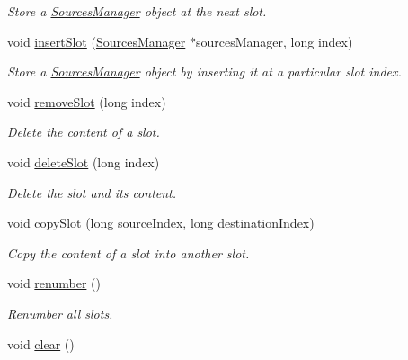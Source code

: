\begin{DoxyCompactItemize}
\begin{DoxyCompactList}\small\item\em Store a \hyperlink{class_hoa2_d_1_1_sources_manager}{Sources\-Manager} object at the next slot. \end{DoxyCompactList}\item 
void \hyperlink{class_hoa2_d_1_1_sources_preset_a1b222c53d1ce33556595c7b16477cc8c}{insert\-Slot} (\hyperlink{class_hoa2_d_1_1_sources_manager}{Sources\-Manager} $\ast$sources\-Manager, long index)
\begin{DoxyCompactList}\small\item\em Store a \hyperlink{class_hoa2_d_1_1_sources_manager}{Sources\-Manager} object by inserting it at a particular slot index. \end{DoxyCompactList}\item 
void \hyperlink{class_hoa2_d_1_1_sources_preset_aaab4fce35fcf185b08abd056c61ef930}{remove\-Slot} (long index)
\begin{DoxyCompactList}\small\item\em Delete the content of a slot. \end{DoxyCompactList}\item 
void \hyperlink{class_hoa2_d_1_1_sources_preset_a2e3564af83143c51f826c4a0a4366ab9}{delete\-Slot} (long index)
\begin{DoxyCompactList}\small\item\em Delete the slot and its content. \end{DoxyCompactList}\item 
void \hyperlink{class_hoa2_d_1_1_sources_preset_a6fd54f266d7aee8e7b0dca9e1c5d4ab6}{copy\-Slot} (long source\-Index, long destination\-Index)
\begin{DoxyCompactList}\small\item\em Copy the content of a slot into another slot. \end{DoxyCompactList}\item 
\hypertarget{class_hoa2_d_1_1_sources_preset_ae23c21b6e292b25e154064523236ce17}{void \hyperlink{class_hoa2_d_1_1_sources_preset_ae23c21b6e292b25e154064523236ce17}{renumber} ()}\label{class_hoa2_d_1_1_sources_preset_ae23c21b6e292b25e154064523236ce17}

\begin{DoxyCompactList}\small\item\em Renumber all slots. \end{DoxyCompactList}\item 
\hypertarget{class_hoa2_d_1_1_sources_preset_a5a0c7de3777e9a3d4d1adb023ba02fff}{void \hyperlink{class_hoa2_d_1_1_sources_preset_a5a0c7de3777e9a3d4d1adb023ba02fff}{clear} ()}\label{class_hoa2_d_1_1_sources_preset_a5a0c7de3777e9a3d4d1adb023ba02fff}


\end{DoxyCompactItemize}
